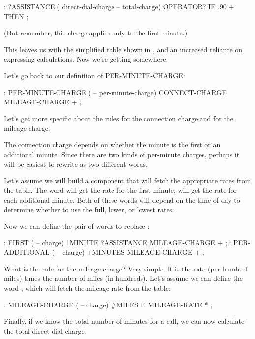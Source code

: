 \begin{Code}
: ?ASSISTANCE
   ( direct-dial-charge -- total-charge)
   OPERATOR? IF .90 + THEN ;
\end{Code}
(But remember, this charge applies only to the first minute.)


This leaves us with the simplified table shown in , and an
increased reliance on expressing calculations. Now we're getting
somewhere.

Let's go back to our definition of PER-MINUTE-CHARGE:
\begin{Code}
: PER-MINUTE-CHARGE ( -- per-minute-charge)
   CONNECT-CHARGE  MILEAGE-CHARGE  + ;
\end{Code}
Let's get more specific about the rules for the connection charge and for
the mileage charge.

The connection charge depends on whether the minute is the first or
an additional minute. Since there are two kinds of per-minute charges,
perhaps it will be easiest to rewrite  as two
different words.

Let's assume we will build a component that will fetch the appropriate
rates from the table. The word  will get the rate for
the first minute;  will get the rate for each
additional minute.  Both of these words will depend on the time of day
to determine whether to use the full, lower, or lowest rates.

Now we can define the pair of words to replace :


\begin{Code}
: FIRST  ( -- charge)
  1MINUTE  ?ASSISTANCE   MILEAGE-CHARGE + ;
: PER-ADDITIONAL  ( -- charge)
   +MINUTES  MILEAGE-CHARGE + ;
\end{Code}
What is the rule for the mileage charge? Very simple. It is the rate
(per hundred miles) times the number of miles (in hundreds). Let's
assume we can define the word , which will fetch
the mileage rate from the table:

\begin{Code}
: MILEAGE-CHARGE  ( -- charge)
   #MILES @  MILEAGE-RATE * ;
\end{Code}
Finally, if we know the total number of minutes for a call, we can now
calculate the total direct-dial charge:

